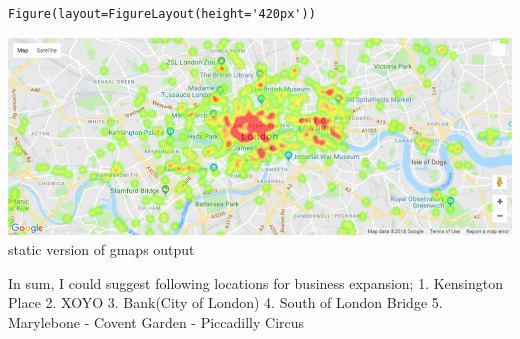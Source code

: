 \documentclass[11pt]{article}
\makeatletter
\def\maxwidth{\ifdim\Gin@nat@width>\linewidth\linewidth
    \else\Gin@nat@width\fi}
\let\Oldincludegraphics\includegraphics
\renewcommand{\includegraphics}[1]{\Oldincludegraphics[width=.8\maxwidth]{#1}}
\makeatother
\begin{document}
    
    \begin{verbatim}
Figure(layout=FigureLayout(height='420px'))
    \end{verbatim}

    
    \includegraphics{overall_map.png} static version of gmaps output

    In sum, I could suggest following locations for business expansion; 1.
Kensington Place 2. XOYO 3. Bank(City of London) 4. South of London
Bridge 5. Marylebone - Covent Garden - Piccadilly Circus


    
    
    
    
\end{document}
